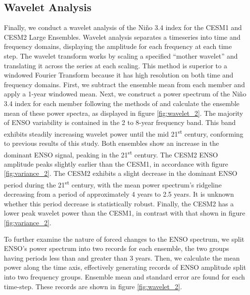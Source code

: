 \documentclass[11pt]{article}
\begin{document}
\subsection{Wavelet Analysis}

Finally, we conduct a wavelet analysis of the Niño 3.4 index for the CESM1 and CESM2 Large Ensembles. Wavelet analysis separates a timeseries into time and frequency domains, displaying the amplitude for each frequency at each time step. The wavelet transform works by scaling a specified ``mother wavelet'' and translating it across the series at each scaling. This method is superior to a windowed Fourier Transform because it has high resolution on both time and frequency domains. First, we subtract the ensemble mean from each member and apply a 1-year windowed mean. Next, we construct a power spectrum of the Niño 3.4 index for each member following the methods of \cite{torrence1998practical} and calculate the ensemble mean of these power spectra, as displayed in figure \ref{fig:wavelet_2}. The majority of ENSO variability is contained in the 2 to 8-year frequency band. This band exhibits steadily increasing wavelet power until the mid 21\textsuperscript{st} century, conforming to previous results of this study. Both ensembles show an increase in the dominant ENSO signal, peaking in the 21\textsuperscript{st} century. The CESM2 ENSO amplitude peaks slightly earlier than the CESM1, in accordance with figure \ref{fig:variance_2}. The CESM2 exhibits a slight decrease in the dominant ENSO period during the 21\textsuperscript{st} century, with the mean power spectrum's ridgeline decreasing from a period of approximately 4 years to 2.5 years. It is unknown whether this period decrease is statistically robust. Finally, the CESM2 has a lower peak wavelet power than the CESM1, in contrast with that shown in figure \ref{fig:variance_2}.

To further examine the nature of forced changes to the ENSO spectrum, we split ENSO's power spectrum into two records for each ensemble, the two groups having periods less than and greater than 3 years. Then, we calculate the mean power along the time axis, effectively generating records of ENSO amplitude split into two frequency groups. Ensemble mean and standard error are found for each time-step. These records are shown in figure \ref{fig:wavelet_2}.
\end{document}

